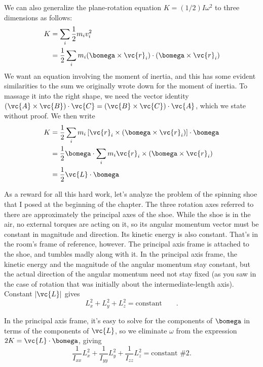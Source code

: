 We can also generalize the plane-rotation equation
$K=(1/2)I\omega^2$ to three dimensions as follows:
\begin{align*}
        K        &= \sum_i \frac{1}{2} m_i v_i^2 \\
                & = \frac{1}{2} \sum_i m_i (\bomega \times \vc{r}_i) \cdot (\bomega \times \vc{r}_i) 
\end{align*}
We want an equation involving the moment of inertia, and
this has some evident similarities to the sum we originally
wrote down for the moment of inertia. To massage it into the
right shape, we need the vector identity 
$(\vc{A}\times\vc{B})\cdot\vc{C}= (\vc{B}\times\vc{C}) \cdot \vc{A}$,
which we state without proof. We then write
\begin{align*}
        K        & = \frac{1}{2} \sum_i m_i 
                        \left[ \vc{r}_i \times (\bomega \times \vc{r}_i)
                        \right] \cdot \bomega \\
                &= \frac{1}{2} \bomega \cdot \sum_i m_i\vc{r}_i \times (\bomega \times \vc{r}_i)  \\
                &= \frac{1}{2} \vc{L} \cdot \bomega
\end{align*}

As a reward for all this hard work, let's analyze the
problem of the spinning shoe that I posed at the beginning
of the chapter. The three rotation axes referred to there
are approximately the principal axes of the shoe. While the
shoe is in the air, no external torques are acting on it, so
its angular momentum vector must be constant in magnitude
and direction. Its kinetic energy is also constant. That's in the room's
frame of reference, however. The principal axis frame is
attached to the shoe, and tumbles madly along with it. In
the principal axis frame, the kinetic energy and the magnitude of the
angular momentum stay constant, but the actual direction of
the angular momentum need not stay fixed (as you saw in the
case of rotation that was initially about the
intermediate-length axis). Constant $|\vc{L}|$ gives
\begin{equation*}
        L_x^2 + L_y^2+ L_z^2   =   \text{constant} \qquad .
\end{equation*}

In the principal axis frame, it's easy to solve for the components of $\bomega$ in
terms of the components of $\vc{L}$, so we eliminate $\omega$ from the expression $2K=\vc{L}\cdot\bomega$, giving        
\begin{equation*}
   \frac{1}{I_{xx}}L_x^2 +  \frac{1}{I_{yy}}L_y^2 +  \frac{1}{I_{zz}}L_z^2 =   \text{constant \#2}  .
\end{equation*}

